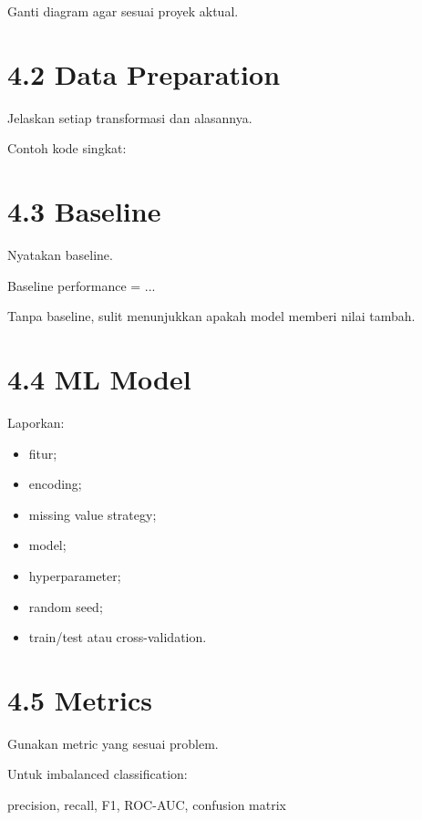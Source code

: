 \documentclass[
  indonesian,
  letterpaper,
  DIV=11,
  numbers=noendperiod]{scrreprt}
\newenvironment{Shaded}{\begin{snugshade}}{\end{snugshade}}
\newcommand{\NormalTok}[1]{\textcolor[rgb]{0.00,0.23,0.31}{#1}}
\providecommand{\tightlist}{%
  \setlength{\itemsep}{0pt}\setlength{\parskip}{0pt}}
\begin{document}
Ganti diagram agar sesuai proyek aktual.

\section{4.2 Data Preparation}\label{data-preparation-1}

Jelaskan setiap transformasi dan alasannya.

Contoh kode singkat:

\section{4.3 Baseline}\label{baseline-1}

Nyatakan baseline.

\begin{Shaded}
\begin{Highlighting}[]
\NormalTok{Baseline performance = ...}
\end{Highlighting}
\end{Shaded}

Tanpa baseline, sulit menunjukkan apakah model memberi nilai tambah.

\section{4.4 ML Model}\label{ml-model}

Laporkan:

\begin{itemize}
\tightlist
\item
  fitur;
\item
  encoding;
\item
  missing value strategy;
\item
  model;
\item
  hyperparameter;
\item
  random seed;
\item
  train/test atau cross-validation.
\end{itemize}

\section{4.5 Metrics}\label{metrics}

Gunakan metric yang sesuai problem.

Untuk imbalanced classification:

\begin{Shaded}
\begin{Highlighting}[]
\NormalTok{precision, recall, F1, ROC{-}AUC, confusion matrix}
\end{Highlighting}
\end{Shaded}
\end{document}
